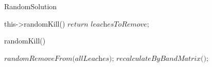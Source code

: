 \begin{algorithm}
\caption{RandomSolution}\label{euclid}
\begin{algorithmic}[1]
\Do
    \State this->randomKill()
\State $\textit{return leachesToRemove;}$
\end{algorithmic}
\end{algorithm}

\begin{algorithm}
\caption{randomKill()}\label{euclid}
\begin{algorithmic}[1]
\State $\textit{randomRemoveFrom(allLeaches);}$ 
\State $\textit{recalculateByBandMatrix();}$
\end{algorithmic}
\end{algorithm}

